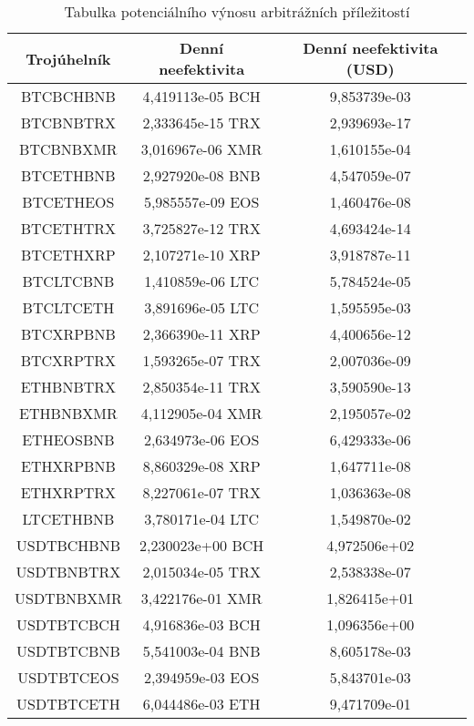 \begin{table}\centering
\caption{Tabulka potenciálního výnosu arbitrážních příležitostí}
\label{table_gains}
\begin{tabular}{|| c | c | c ||}\hline Trojúhelník & Denní neefektivita & Denní neefektivita (USD)\\ [0.5ex]
 \hline\hline BTCBCHBNB & 4,419113e-05 BCH & 9,853739e-03\\ 
 \hline BTCBNBTRX & 2,333645e-15 TRX & 2,939693e-17\\ 
 \hline BTCBNBXMR & 3,016967e-06 XMR & 1,610155e-04\\ 
 \hline BTCETHBNB & 2,927920e-08 BNB & 4,547059e-07\\ 
 \hline BTCETHEOS & 5,985557e-09 EOS & 1,460476e-08\\ 
 \hline BTCETHTRX & 3,725827e-12 TRX & 4,693424e-14\\ 
 \hline BTCETHXRP & 2,107271e-10 XRP & 3,918787e-11\\ 
 \hline BTCLTCBNB & 1,410859e-06 LTC & 5,784524e-05\\ 
 \hline BTCLTCETH & 3,891696e-05 LTC & 1,595595e-03\\ 
 \hline BTCXRPBNB & 2,366390e-11 XRP & 4,400656e-12\\ 
 \hline BTCXRPTRX & 1,593265e-07 TRX & 2,007036e-09\\ 
 \hline ETHBNBTRX & 2,850354e-11 TRX & 3,590590e-13\\ 
 \hline ETHBNBXMR & 4,112905e-04 XMR & 2,195057e-02\\ 
 \hline ETHEOSBNB & 2,634973e-06 EOS & 6,429333e-06\\ 
 \hline ETHXRPBNB & 8,860329e-08 XRP & 1,647711e-08\\ 
 \hline ETHXRPTRX & 8,227061e-07 TRX & 1,036363e-08\\ 
 \hline LTCETHBNB & 3,780171e-04 LTC & 1,549870e-02\\ 
 \hline USDTBCHBNB & 2,230023e+00 BCH & 4,972506e+02\\ 
 \hline USDTBNBTRX & 2,015034e-05 TRX & 2,538338e-07\\ 
 \hline USDTBNBXMR & 3,422176e-01 XMR & 1,826415e+01\\ 
 \hline USDTBTCBCH & 4,916836e-03 BCH & 1,096356e+00\\ 
 \hline USDTBTCBNB & 5,541003e-04 BNB & 8,605178e-03\\ 
 \hline USDTBTCEOS & 2,394959e-03 EOS & 5,843701e-03\\ 
 \hline USDTBTCETH & 6,044486e-03 ETH & 9,471709e-01\\ 

\end{tabular}
\end{table}
